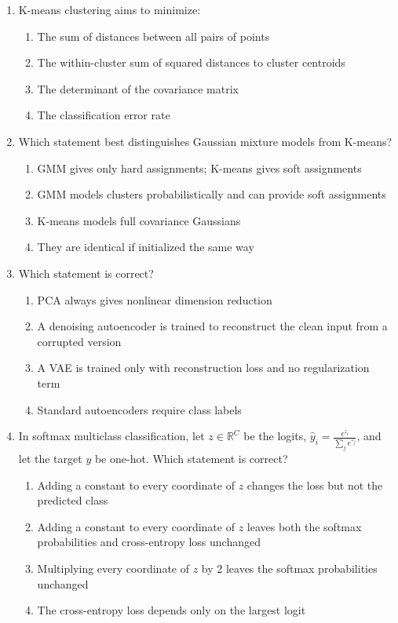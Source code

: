 \documentclass[11pt]{article}
\newcommand{\cmark}{\ding{51}}
\begin{document}
\begin{enumerate}[leftmargin=*]
\item K-means clustering aims to minimize:

\begin{enumerate}[label=\Alph*.]
    \item The sum of distances between all pairs of points
    \item The within-cluster sum of squared distances to cluster centroids \cmark
    \item The determinant of the covariance matrix
    \item The classification error rate
\end{enumerate}

\item Which statement best distinguishes Gaussian mixture models from K-means?

\begin{enumerate}[label=\Alph*.]
    \item GMM gives only hard assignments; K-means gives soft assignments
    \item GMM models clusters probabilistically and can provide soft assignments \cmark
    \item K-means models full covariance Gaussians
    \item They are identical if initialized the same way
\end{enumerate}

\item Which statement is correct?

\begin{enumerate}[label=\Alph*.]
    \item PCA always gives nonlinear dimension reduction
    \item A denoising autoencoder is trained to reconstruct the clean input from a corrupted version \cmark
    \item A VAE is trained only with reconstruction loss and no regularization term
    \item Standard autoencoders require class labels
\end{enumerate}


\item In softmax multiclass classification, let $z \in \mathbb{R}^C$ be the logits, $\hat y_i = \frac{e^{z_i}}{\sum_j e^{z_j}}$, and let the target $y$ be one-hot. Which statement is correct?

\begin{enumerate}[label=\Alph*.]
    \item Adding a constant to every coordinate of $z$ changes the loss but not the predicted class
    \item Adding a constant to every coordinate of $z$ leaves both the softmax probabilities and cross-entropy loss unchanged \cmark
    \item Multiplying every coordinate of $z$ by 2 leaves the softmax probabilities unchanged
    \item The cross-entropy loss depends only on the largest logit
\end{enumerate}


\end{enumerate}
\end{document}
